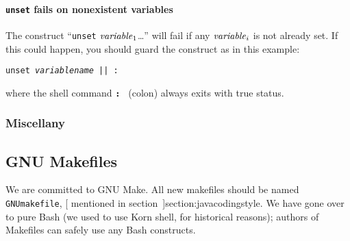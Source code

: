 \paragraph{{\bf \tt unset} fails on nonexistent variables}
The construct ``{\tt unset} \(\mbox{\textit{variable}}_1\)\ldots'' will
fail if any \(\mbox{\textit{variable}}_i\) is not already set.
If this could happen, you should guard the construct as in this
example:
\begin{example}
\tt{}unset {\it{}variablename\/} || :
\end{example} 
where the shell command {\bf \tt : } (colon) always exits with true
status.



\subsubsection{Miscellany}

\subsection{GNU Makefiles} 

We are committed to GNU Make.  All new makefiles should be named {\tt
GNUmakefile}, [
  mentioned in section~\Ref]{section:javacodingstyle}.  We have gone
over to pure Bash 
(we used to use Korn shell, for historical reasons); authors of
Makefiles can safely use any Bash constructs.

